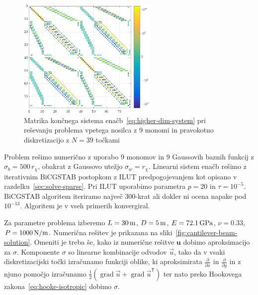 \documentclass[12pt,a4paper,twoside]{article}
\theoremstyle{definition} %
\theoremstyle{plain} %
\numberwithin{equation}{section}
\newcommand{\T}{\mathsf{T}}
\newcommand{\grad}{\operatorname{grad}}
\renewcommand{\b}{\boldsymbol}
\newcommand{\dpar}[2]{\ensuremath{\frac{\partial #1}{\partial #2}}}
\newcommand{\vu}{\vec{u}}
\newcommand{\ts}{\sigma}
\begin{document}
\begin{figure}[!h]
  \centering
  \includegraphics[width=0.6\textwidth]{images/cantilever_beam_matrix_example.pdf}
  \caption[Matrika sistema enačb pri reševanju problema vpetega
  nosilca.]{Matrika končnega sistema enačb~\eqref{eq:higher-dim-system} pri
  reševanju problema vpetega nosilca z 9 monomi in pravokotno
  diskretizacijo z $N = 39$ točkami}
  \label{fig:cantilever-beam-matrix}
\end{figure}

Problem rešimo numerično z uporabo 9 monomov in 9 Gaussovih baznih funkcij z $\sigma_b =
500\,r_\chi$, obakrat z Gaussovo utežjo $\sigma_w = r_\chi$.
Linearni sistem enačb rešimo z iterativnim BiCGSTAB postopkom z ILUT predpogojevanjem
kot opisano v razdelku~\ref{sec:solve-sparse}. Pri ILUT uporabimo parametra $p=20$ in $\tau = 10^{-5}$.
BiCGSTAB algoritem iteriramo največ 300-krat ali dokler ni ocena napake pod $10^{-13}$.
Algoritem je v vseh primerih konvergiral.

Za parametre problema izberemo $L = \unit[30]{m}$, $D = \unit[5]{m}$, $E = \unit[72.1]{GPa}$,
$\nu = 0.33$, $P = \unit[1000]{N/m}$. Numerična rešitev je prikazana na
sliki~\ref{fig:cantilever-beam-solution}. Omeniti je treba še, kako iz numerične rešitve $\b{u}$
dobimo aproksimacijo za $\ts$. Komponente $\ts$ so linearne kombinacije odvodov $\vu$, tako da v
vsaki diskretizacijski točki izračunamo funkciji oblike, ki aproksimirata $\dpar{}{x}$ in
$\dpar{}{y}$ in z njuno pomočjo izračunamo $\frac12 (\grad\vu + \grad\vu^\T)$ ter nato preko
Hookovega zakona~\eqref{eq:hooke-isotropic} dobimo $\ts$.
\end{document}
